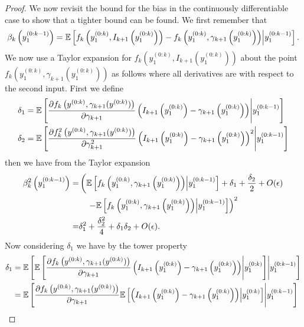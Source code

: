 \begin{proof}
We now revisit the bound for the bias in the continuously differentiable case to
show that a tighter bound can be found.  We first remember that
\[
\beta_k \left(y_1^{(0:k-1)} \right) =
\mathbb{E} \left[f_k\left(y^{(0:k)}_1, I_{k+1}\left(y^{(0:k)}_1\right)\right)
- f_k\left(y^{(0:k)}_1, \gamma_{k+1}\left(y^{(0:k)}_1\right)\right)
\middle|  y_1^{(0:k-1)} \right].
\]
We now use a Taylor expansion for $f_k\left(y^{(0:k)}_1, I_{k+1}\left(y^{(0:k)}_1\right)\right)$ about the point
$f_k\left(y^{(0:k)}_1, \gamma_{k+1}\left(y^{(0:k)}_1\right)\right)$
as follows where all derivatives are with respect to the second input.  First we
define
\begin{align*}
\delta_1 &= \mathbb{E} \left[\frac{\partial f_k \left(y^{(0:k)},\gamma_{k+1}(y^{(0:k)})\right)}{\partial \gamma_{k+1}}
\left(I_{k+1}\left(y^{(0:k)}_1\right) - \gamma_{k+1}\left(y^{(0:k)}_1\right)\right)
\middle|  y_1^{(0:k-1)} \right] \\
\delta_2 &= \mathbb{E} \left[ \frac{\partial f_k^2 \left(y^{(0:k)},\gamma_{k+1}(y^{(0:k)})\right)}{\partial \gamma_{k+1}^2}
\left(I_{k+1}\left(y^{(0:k)}_1\right) - \gamma_{k+1}\left(y^{(0:k)}_1\right)\right)^2
\middle|  y_1^{(0:k-1)} \right] 
\end{align*}
then we have from the Taylor expansion
\begin{align*}
\beta_k^2 \left(y_1^{(0:k-1)} \right) =& 
\left(\mathbb{E} \left[f_k\left(y^{(0:k)}_1, \gamma_{k+1}\left(y^{(0:k)}_1\right)\right)
\middle|  y_1^{(0:k-1)} \right]+
\delta_1+\frac{\delta_2}{2}
+O(\epsilon) \right.\\
&\left.\quad-\mathbb{E} \left[f_k\left(y^{(0:k)}_1, \gamma_{k+1}\left(y^{(0:k)}_1\right)\right)
\middle|  y_1^{(0:k-1)} \right]\right)^2 \\
=&\delta_1^2+\frac{\delta_2^2}{4}+\delta_1\delta_2 +O(\epsilon).
\end{align*}
Now considering $\delta_1$ we have by the tower property
\begin{align*}
\delta_1 &= \mathbb{E} \left[ \mathbb{E} \left[\frac{\partial f_k \left(y^{(0:k)},\gamma_{k+1}(y^{(0:k)})\right)}{\partial \gamma_{k+1}}
\left(I_{k+1}\left(y^{(0:k)}_1\right) - \gamma_{k+1}\left(y^{(0:k)}_1\right)\right)
\middle|  y_1^{(0:k)} \right] \middle|  y_1^{(0:k-1)} \right] \\
&= \mathbb{E} \left[ 
\frac{\partial f_k \left(y^{(0:k)},\gamma_{k+1}(y^{(0:k)})\right)}{\partial \gamma_{k+1}} \mathbb{E} \left[
\left(I_{k+1}\left(y^{(0:k)}_1\right) - \gamma_{k+1}\left(y^{(0:k)}_1\right)\right)
\middle|  y_1^{(0:k)} \right] \middle|  y_1^{(0:k-1)} \right]
\end{align*}

\end{proof}
